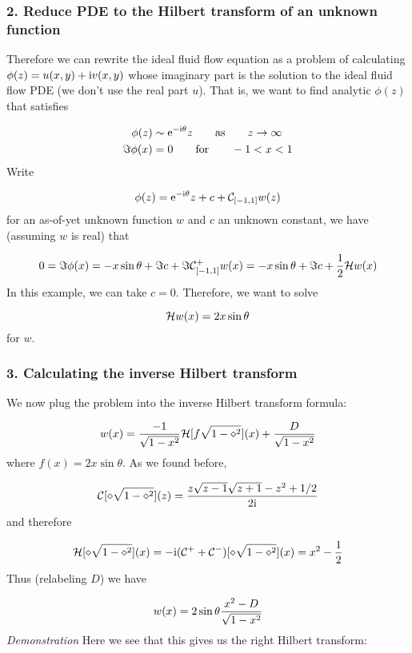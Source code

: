 \documentclass[12pt,landscape]{article}
\def\I{ {\rm i} }
\def\E{ {\rm e} }
\def\CC{ {\cal C} }
\def\HH{ {\cal H} }
\begin{document}
{\subsubsection{2. Reduce PDE to the Hilbert transform of an unknown function}
Therefore we can rewrite the ideal fluid flow equation as a problem of calculating $\phi(z) = u(x,y) + \I v(x,y)$ whose imaginary part is the solution to the ideal fluid flow PDE (we don't use the real part $u$). That is, we want to find analytic $\phi(z)$ that satisfies


\begin{align*}
    \phi(z) &\sim \E^{-\I \theta} z \qquad\hbox{as}\qquad z \to \infty \\
    \Im \phi(x) &= 0  \qquad\hbox{for}\qquad -1 < x < 1
\end{align*}
Write

\[
\phi(z) = \E^{-\I \theta} z + c + \CC_{[-1,1]} w(z)
\]
for an as-of-yet unknown function $w$ and $c$ an unknown constant, we have (assuming $w$ is real) that

\[
0 = \Im \phi(x) = -x \sin \theta + \Im c + \Im \CC_{[-1,1]}^+ w(x) = -x \sin \theta + \Im c +{1 \over 2} \HH w(x)
\]
In this example, we can take $c = 0$. Therefore, we want to solve

\[
\HH w(x) =  2 x  \sin \theta
\]
for $w$.

\subsubsection{3. Calculating the inverse Hilbert transform}
We now plug the problem into the inverse Hilbert transform formula:

\[
    w(x) = {- 1\over \sqrt{1-x^2}} {\cal H}[f \sqrt{1-\diamond^2}](x)  + {D \over \sqrt{1-x^2}}
\]
where $f(x) = 2 x \sin \theta$. As we found before,

\[
{\cal C}[\diamond \sqrt{1-\diamond^2}](z) = {z \sqrt{z-1} \sqrt{z+1} - z^2 + 1/2 \over 2 \I }
\]
and therefore

\[
{\cal H}[\diamond \sqrt{1-\diamond^2}](x) = -\I({\cal C}^+ + {\cal C}^-)[\diamond \sqrt{1-\diamond^2}](x) = x^2 - {1 \over 2}
\]
Thus (relabeling $D$) we have

\[
w(x) = 2\sin \theta {x^2-D  \over \sqrt{1-x^2}}
\]
\newpage
\emph{Demonstration} Here we see that this gives us the right Hilbert transform:


}
\end{document}
